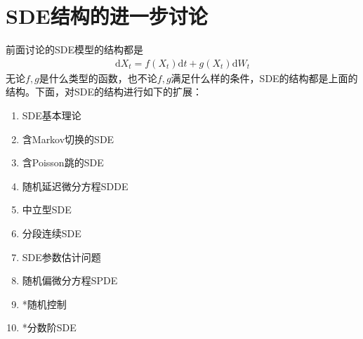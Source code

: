 \section{SDE结构的进一步讨论}
    \par
    前面讨论的SDE模型的结构都是
    \begin{align*}
    \mathrm{d}X_t = f(X_t)\mathrm{d}t + g(X_t)\mathrm{d}W_t
    \end{align*}
    无论$f,g$是什么类型的函数，也不论$f,g$满足什么样的条件，SDE的结构都是上面的结构。下面，对SDE的结构进行如下的扩展：
    \begin{enumerate}
        \item SDE基本理论
        \item 含Markov切换的SDE
        \item 含Poisson跳的SDE
        \item 随机延迟微分方程SDDE
        \item 中立型SDE
        \item 分段连续SDE
        \item SDE参数估计问题
        \item 随机偏微分方程SPDE
        \item *随机控制
        \item *分数阶SDE
    \end{enumerate}

